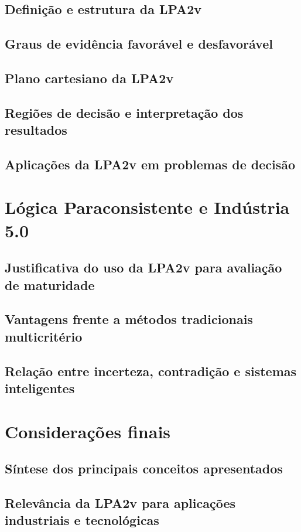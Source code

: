 \subsection{Definição e estrutura da LPA2v}
\subsection{Graus de evidência favorável e desfavorável}
\subsection{Plano cartesiano da LPA2v}
\subsection{Regiões de decisão e interpretação dos resultados}
\subsection{Aplicações da LPA2v em problemas de decisão}

\section{Lógica Paraconsistente e Indústria 5.0}
\subsection{Justificativa do uso da LPA2v para avaliação de maturidade}
\subsection{Vantagens frente a métodos tradicionais multicritério}
\subsection{Relação entre incerteza, contradição e sistemas inteligentes}

\section{Considerações finais}
\subsection{Síntese dos principais conceitos apresentados}
\subsection{Relevância da LPA2v para aplicações industriais e tecnológicas}
